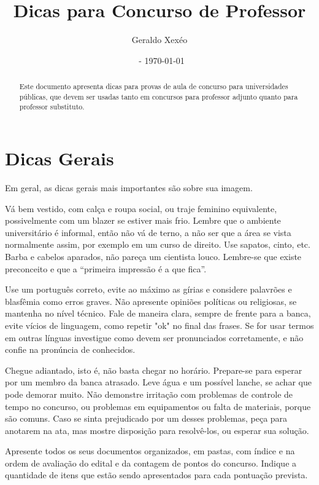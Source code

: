 \documentclass[12pt]{article}
\title{Dicas para Concurso de Professor}
\author{Geraldo Xexéo}
\affil{\url{xexeo@ufrj.br} \\
\url{http://xexeo.net}}
\date{\ccbyncsa\  - \today}
\begin{document}
\maketitle

\begin{abstract}
    Este documento apresenta dicas para provas de aula de concurso para universidades públicas, que devem ser usadas tanto em concursos para professor adjunto quanto para professor substituto.
\end{abstract}

\section{Dicas Gerais}

Em geral, as dicas gerais mais importantes são sobre sua imagem.

Vá bem vestido, com calça e roupa social, ou traje feminino equivalente, possivelmente com um blazer se estiver mais frio. Lembre que o ambiente universitário é informal, então não vá de terno, a não ser que a área se vista normalmente assim, por exemplo em um curso de direito. Use sapatos, cinto, etc. Barba e cabelos aparados, não pareça um cientista louco. Lembre-se que existe preconceito e que a ``primeira impressão é a que fica''.

Use um português correto, evite ao máximo as gírias e considere palavrões e blasfêmia como erros graves. Não apresente opiniões políticas ou religiosas, se mantenha no nível técnico. Fale de maneira clara, sempre de frente para a banca, evite vícios de linguagem, como repetir "ok" no final das frases. Se for usar termos em outras línguas investigue como devem ser pronunciados corretamente, e não confie na pronúncia de conhecidos.




Chegue adiantado, isto é, não basta chegar no horário. Prepare-se para esperar por um membro da banca atrasado. Leve água e um possível lanche, se achar que pode demorar muito. Não demonstre irritação com problemas de controle de tempo no concurso, ou problemas em equipamentos ou falta de materiais, porque são comuns. Caso se sinta prejudicado por um desses problemas, peça para anotarem na ata, mas mostre disposição para resolvê-los, ou esperar sua solução.

Apresente todos os seus documentos organizados, em pastas, com índice e na ordem de avaliação do edital e da contagem de pontos do concurso. Indique a quantidade de itens que estão sendo apresentados para cada pontuação prevista.
\end{document}
